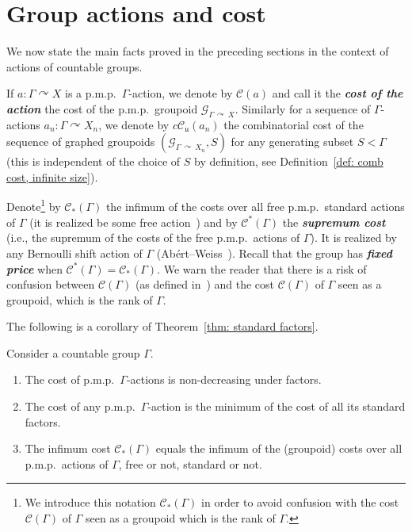 \documentclass[AHL,Unicode,longabstracts,published]{cedram}
\newcommand{\defin}[1]{\textbf{\emph{#1}}}
\newcommand{\acting}{\curvearrowright}
\newcommand{\cost}{\mathcal{C}}
\newcommand{\ccost}{c\mathcal{C}}
\newcommand{\cg}{\mathcal{G}}
\newcommand{\vraicost}{\mathscr{C}}
\newcommand{\ul}{\mathfrak{u}}
\newcommand{\pmp}{p.m.p.\ }
\begin{document}
\section{Group actions and cost}\label{sect: gp act and cost}

We now state the main facts proved in the preceding sections in the context of actions of countable groups.

If $a: \Gamma\acting X$ is a \pmp $\Gamma$-action, we denote by $\cost(a)$ and call it the
\defin{cost of the action} the cost of the \pmp groupoid $\cg_{\Gamma\,\acting\,X}$. Similarly for a sequence of $\Gamma$-actions $a_n:\Gamma\acting X_n$, we denote by $\ccost_\ul(a_n)$ the combinatorial cost of the sequence of graphed groupoids $(\cg_{\Gamma\,\acting\,X_n}, S)$ for any generating subset $S<\Gamma$ (this is independent of the choice of $S$ by definition, see Definition~\ref{def: comb cost, infinite size}).


Denote\footnote{We introduce this notation $\vraicost_{*}(\Gamma)$ in order to avoid confusion with the cost $\cost(\Gamma)$ of $\Gamma$ seen as a groupoid which is the rank of $\Gamma$.} by $\vraicost_*(\Gamma)$ the infimum of the costs over all free \pmp standard actions of $\Gamma$ (it is realized be some free action~\cite[Proposition~VI.21]{Gab-cost}) and by $\vraicost^*(\Gamma)$ the
\defin{supremum cost} (i.e., the supremum of the costs of the free \pmp actions of $\Gamma$). It is realized by any Bernoulli shift action of $\Gamma$ (Abért--Weiss~\cite{Abert-Weiss-2013}). Recall that the group has
\defin{fixed price} when $\vraicost^*(\Gamma)= \vraicost_*(\Gamma)$. We warn the reader that there is a risk of confusion between $\vraicost(\Gamma)$ (as defined in~\cite{Gab-cost}) and the cost $\cost(\Gamma)$ of $\Gamma$ seen as a groupoid, which is the rank of $\Gamma$.

The following is a corollary of Theorem~\ref{thm: standard factors}.

\begin{coro}\label{cor:monotonicitygroup}
Consider a countable group $\Gamma$.
\begin{enumerate}
\item \label{coro4.1.1} The cost of \pmp $\Gamma$-actions is non-decreasing under factors.

\item \label{coro4.1.2}The cost of any \pmp $\Gamma$-action is the minimum of the cost of all its standard factors.

\item \label{coro4.1.3}The infimum cost $\vraicost_{*}(\Gamma)$ equals the infimum of the (groupoid) costs over all \pmp actions of $\Gamma$, free or not, standard or not.
\end{enumerate}
\end{coro}
\end{document}
